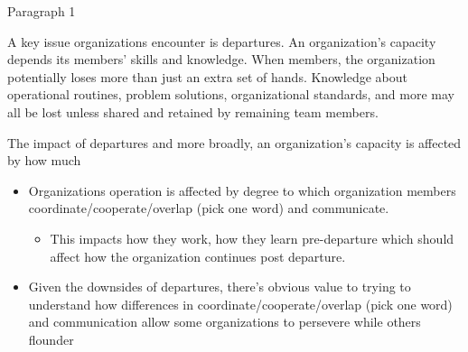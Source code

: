 \documentclass[12pt,notitlepage]{article}
\begin{document}
Paragraph 1

A key issue organizations encounter is departures. An organization's capacity depends its members' skills and knowledge. When members, the organization potentially loses more than just an extra set of hands. Knowledge about operational routines, problem solutions, organizational standards, and more may all be lost unless shared and retained by remaining team members. 

The impact of departures and more broadly, an organization's capacity is affected by how much 


\begin{itemize}
    \item Organizations operation is affected by degree to which organization members coordinate/cooperate/overlap (pick one word) and communicate.
    \begin{itemize}
        \item This impacts how they work, how they learn pre-departure which should affect how the organization continues post departure. 
    \end{itemize}
    \item Given the downsides of departures, there's obvious value to trying to understand how differences in coordinate/cooperate/overlap (pick one word) and communication allow some organizations to persevere while others flounder
\end{itemize}
\end{document}

